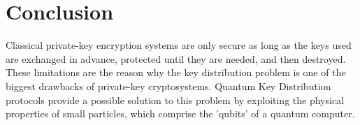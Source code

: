 \documentclass[conference]{IEEEtran}
\begin{document}
%



\section{Conclusion}
Classical private-key encryption systems are only secure as long as the keys used are exchanged in advance, protected until they are needed, and then destroyed. These limitations are the reason why the key distribution problem is one of the biggest drawbacks of private-key cryptosystems. Quantum Key Distribution protocols provide a possible solution to this problem by exploiting the physical properties of small particles, which comprise the 'qubits' of a quantum computer.\\
\end{document}
